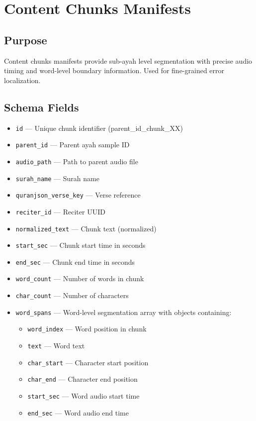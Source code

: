 \newpage

\section{Content Chunks Manifests}

\subsection{Purpose}
Content chunks manifests provide sub-ayah level segmentation with precise audio timing and word-level boundary information. Used for fine-grained error localization.

\subsection{Schema Fields}

\begin{itemize}
  \item \texttt{id} — Unique chunk identifier (parent\_id\_chunk\_XX)
  \item \texttt{parent\_id} — Parent ayah sample ID
  \item \texttt{audio\_path} — Path to parent audio file
  \item \texttt{surah\_name} — Surah name
  \item \texttt{quranjson\_verse\_key} — Verse reference
  \item \texttt{reciter\_id} — Reciter UUID
  \item \texttt{normalized\_text} — Chunk text (normalized)
  \item \texttt{start\_sec} — Chunk start time in seconds
  \item \texttt{end\_sec} — Chunk end time in seconds
  \item \texttt{word\_count} — Number of words in chunk
  \item \texttt{char\_count} — Number of characters
  \item \texttt{word\_spans} — Word-level segmentation array with objects containing:
  \begin{itemize}
    \item \texttt{word\_index} — Word position in chunk
    \item \texttt{text} — Word text
    \item \texttt{char\_start} — Character start position
    \item \texttt{char\_end} — Character end position
    \item \texttt{start\_sec} — Word audio start time
    \item \texttt{end\_sec} — Word audio end time
  \end{itemize}
\end{itemize}

